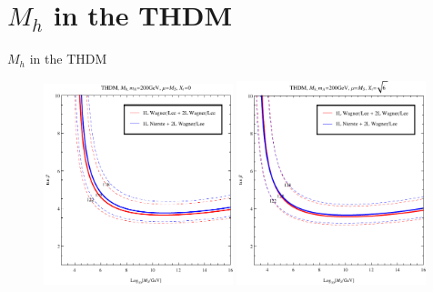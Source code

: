 \documentclass[hyperref={pdfpagelabels=false},ngerman]{beamer}
\begin{document}

\section{$M_h$ in the THDM}

\begin{frame}{$M_h$ in the THDM}
  \begin{figure}
    \centering
    \includegraphics[width=0.49\textwidth]{plots/THDM/THDMIIMSSMBC_Xt-0_combined}
    \includegraphics[width=0.49\textwidth]{plots/THDM/THDMIIMSSMBC_Xt-Sqrt[6]_combined}
  \end{figure}
\end{frame}
\end{document}

